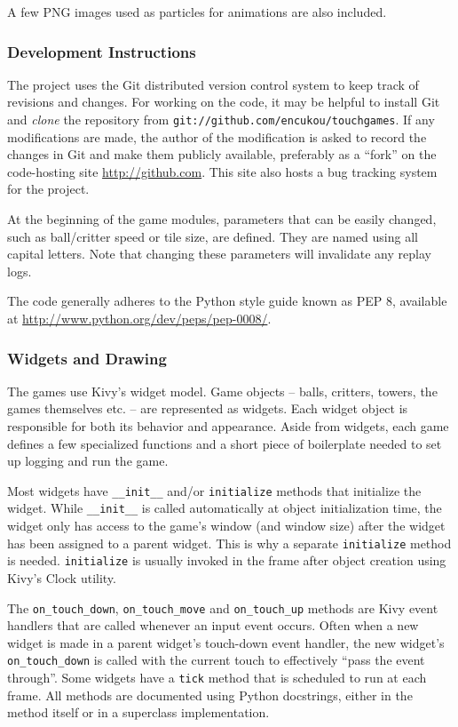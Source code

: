 \documentclass[a4paper,11pt]{article}
\begin{document}
A few PNG images used as particles for animations are also included.

\subsubsection{Development Instructions}

The project uses the Git distributed version control system to keep track of
revisions and changes.
For working on the code, it may be helpful to install Git and \emph{clone}
the repository from \texttt{git://github.com/encukou/touchgames}.
If any modifications are made, the author of the modification is asked to
record the changes in Git and make them publicly available, preferably as a
“fork” on the code-hosting site \url{http://github.com}.
This site also hosts a bug tracking system for the project.

At the beginning of the game modules, parameters that can be easily changed,
such as ball/critter speed or tile size, are defined.
They are named using all capital letters.
Note that changing these parameters will invalidate any replay logs.

The code generally adheres to the Python style guide known as PEP 8, available
at \url{http://www.python.org/dev/peps/pep-0008/}.

\subsubsection{Widgets and Drawing}

The games use Kivy's widget model.
Game objects – balls, critters, towers, the games themselves etc. – are
represented as widgets.
Each widget object is responsible for both its behavior and appearance.
Aside from widgets, each game defines a few specialized functions
and a short piece of boilerplate needed to set up logging and run the game.

Most widgets have \texttt{\_\_init\_\_} and/or \texttt{initialize} methods that
initialize the widget.
While \texttt{\_\_init\_\_} is called automatically at object initialization
time, the widget only has access to the game's window (and window size) after
the widget has been assigned to a parent widget. This is why a separate
\texttt{initialize} method is needed.
\texttt{initialize} is usually invoked in the frame after object creation
using Kivy's Clock utility.

The \texttt{on\_touch\_down}, \texttt{on\_touch\_move} and
\texttt{on\_touch\_up} methods are Kivy event handlers that are called whenever
an input event occurs.
Often when a new widget is made in a parent widget's touch-down event handler,
the new widget's \texttt{on\_touch\_down} is called with the current touch
to effectively “pass the event through”.
Some widgets have a \texttt{tick} method that is scheduled to run at each
frame.
All methods are documented using Python docstrings, either in the method
itself or in a superclass implementation.
\end{document}
